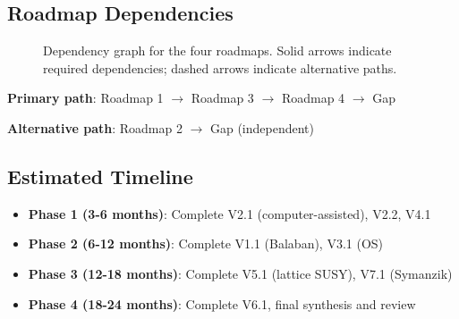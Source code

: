 \subsection{Roadmap Dependencies}

\begin{figure}[ht]
\centering
{}
\caption{Dependency graph for the four roadmaps. Solid arrows indicate 
required dependencies; dashed arrows indicate alternative paths.}
\end{figure}

\textbf{Primary path}: Roadmap 1 $\to$ Roadmap 3 $\to$ Roadmap 4 $\to$ Gap

\textbf{Alternative path}: Roadmap 2 $\to$ Gap (independent)

\subsection{Estimated Timeline}

\begin{itemize}
\item \textbf{Phase 1 (3-6 months)}: Complete V2.1 (computer-assisted), V2.2, V4.1
\item \textbf{Phase 2 (6-12 months)}: Complete V1.1 (Balaban), V3.1 (OS)
\item \textbf{Phase 3 (12-18 months)}: Complete V5.1 (lattice SUSY), V7.1 (Symanzik)
\item \textbf{Phase 4 (18-24 months)}: Complete V6.1, final synthesis and review
\end{itemize}

